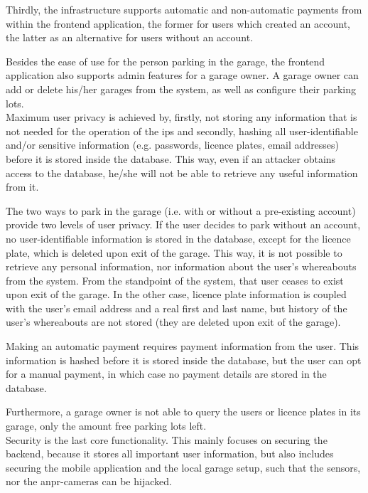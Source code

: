 \ind Thirdly, the infrastructure supports automatic and non-automatic payments from within the frontend application, the former for users which created an account, the latter as an alternative for users without an account. 

\ind Besides the ease of use for the person parking in the garage, the frontend application also supports admin features for a garage owner. A garage owner can add or delete his/her garages from the system, as well as configure their parking lots. \\

Maximum user privacy is achieved by, firstly, not storing any information that is not needed for the operation of the \ac{ips} and secondly, hashing all user-identifiable and/or sensitive information (e.g. passwords, licence plates, email addresses) before it is stored inside the database. This way, even if an attacker obtains access to the database, he/she will not be able to retrieve any useful information from it.

\ind The two ways to park in the garage (i.e. with or without a pre-existing account) provide two levels of user privacy. If the user decides to park without an account, no user-identifiable information is stored in the database, except for the licence plate, which is deleted upon exit of the garage. This way, it is not possible to retrieve any personal information, nor information about the user's whereabouts from the system. From the standpoint of the system, that user ceases to exist upon exit of the garage. In the other case, licence plate information is coupled with the user's email address and a real first and last name, but history of the user's whereabouts are not stored (they are deleted upon exit of the garage).

\ind Making an automatic payment requires payment information from the user. This information is hashed before it is stored inside the database, but the user can opt for a manual payment, in which case no payment details are stored in the database.

\ind Furthermore, a garage owner is not able to query the users or licence plates in its garage, only the amount free parking lots left. \\ 

Security is the last core functionality. This mainly focuses on securing the backend, because it stores all important user information, but also includes securing the mobile application and the local garage setup, such that the sensors, nor the \ac{anpr}-cameras can be hijacked. 

